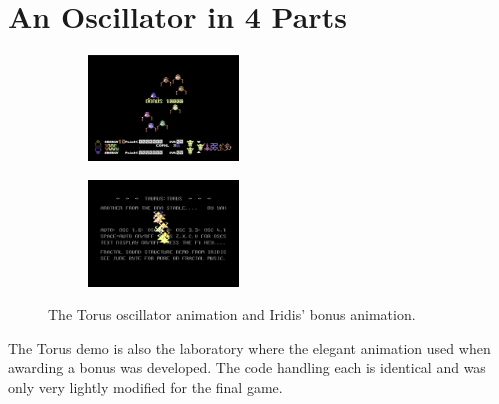 \chapter{An Oscillator in 4 Parts}
\lstset{style=6502Style}
\begin{figure}[H]
{
  \setlength{\tabcolsep}{3.0pt}
  \setlength\cmidrulewidth{\heavyrulewidth} %
    \begin{adjustbox}{width=12cm,center}
  \begin{subfigure}{0.3\textwidth}
  \includegraphics[width=4cm]{torus/bonusbounty.png}%
  \end{subfigure}
  \begin{subfigure}{0.3\textwidth}
  \includegraphics[width=4cm]{torus/torus.png}%
  \end{subfigure}
  \end{adjustbox}
}\caption[]{The Torus oscillator animation and Iridis' bonus animation.}
\end{figure}

The Torus demo is also the laboratory where the elegant animation used when awarding a bonus was developed. The code
handling each is identical and was only very lightly modified for the final game.

\begin{minipage}[b]{0.45\linewidth}
\centering
{}%

\end{minipage}
\hspace{0.5cm}
\begin{minipage}[b]{0.45\linewidth}
\centering
{}%

\end{minipage}


